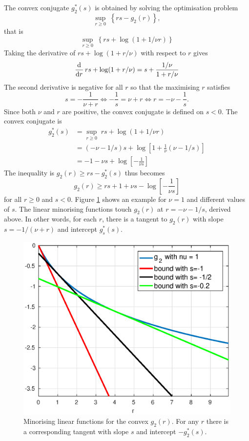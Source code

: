 \documentclass[11pt, oneside]{article}
\begin{document}
The convex conjugate $g_2^*(s)$ is obtained by solving the optimisation problem $$\sup_{r\ge 0} \; \left\{ rs - g_2(r)\right\},$$ that is
\begin{equation}
   \sup_{r\ge 0} \; \left\{rs + \log(1+1/\nu r)\right\}
\end{equation}
Taking the derivative of  $rs + \log(1+r/\nu)$ with respect to $r$ gives
\begin{equation}
  \dod{}{r} rs + \log(1+r/\nu) = s + \frac{1/\nu}{1+r/ \nu}
\end{equation}
The second derivative is negative for all $r$ so that the maximising $r$ satisfies
\begin{equation}
  s  = - \frac{1}{\nu+r} \Longleftrightarrow -\frac{1}{s} = \nu + r \Longleftrightarrow r = -\nu -\frac{1}{s}.
\end{equation}
Since both $\nu$ and $r$ are positive, the convex conjugate is defined on $s<0$.
The convex conjugate is
\begin{align}
  g_2^*(s) & =   \sup_{r\ge 0} \; rs + \log(1+1/\nu r) \\
  & = (-\nu-1/s) s + \log\left[1+ \frac{1}{\nu} (\nu-1/s)\right]\\
  & = -1 -\nu s + \log\left[ -\frac{1}{\nu s}\right]
\end{align}
The inequality is $g_2(r) \ge rs - g_2^*(s)$ thus becomes
\begin{equation}
  g_2(r) \ge rs + 1+ \nu s - \log\left[ -\frac{1}{\nu s}\right] 
\end{equation}
for all $r\ge 0$ and $s<0$. Figure \ref{fig:bound} shows an example
for $\nu=1$ and different values of $s$. The linear minorising
functions touch $g_2(r)$ at $r=-\nu-1/s$, derived above. In other
words, for each $r$, there is a tangent to $g_2(r)$ with slope $s = -1/(\nu+r)$
and intercept $g_s^*(s)$.
\begin{figure}[ht]
  \centering
  \includegraphics[width = 0.75 \textwidth]{bound}
  \caption{\label{fig:bound} Minorising linear functions for the convex $g_2(r)$. For any $r$ there is a corresponding tangent with slope $s$ and intercept $-g_2^*(s)$.}
\end{figure}
\end{document}
